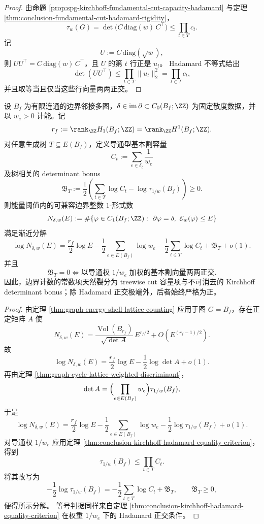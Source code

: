 \begin{proof}
由命题 \ref{prop:spg-kirchhoff-fundamental-cut-capacity-hadamard} 与定理 \ref{thm:conclusion-fundamental-cut-hadamard-rigidity}，
\[
\tau_w(G)=\det\!\bigl(C\,\mathrm{diag}(w)\,C^\top\bigr)\le \prod_{t\in T}c_t.
\]
记
\[
U:=C\,\mathrm{diag}(\sqrt{w}),
\]
则 \(UU^\top=C\,\mathrm{diag}(w)\,C^\top\)，且 \(U\) 的第 \(t\) 行正是 \(u_t\)。
Hadamard 不等式给出
\[
\det(UU^\top)\le \prod_{t\in T}\|u_t\|_2^2=\prod_{t\in T}c_t,
\]
并且取等当且仅当这些行向量两两正交。
\end{proof}

\begin{theorem}\label{thm:conclusion-boundary-1form-cut-determinant-splitting}
设 \(B_f\) 为有限连通的边界邻接多图，\(\delta\in\operatorname{im}\partial\subset C_0(B_f;\ZZ)\) 为固定散度数据，并以 \(w_e>0\) 计能。记
\[
r_f:=\rank_{\ZZ}H_1(B_f;\ZZ)=\rank_{\ZZ}H^1(B_f;\ZZ).
\]
对任意生成树 \(T\subseteq E(B_f)\)，定义导通型基本割容量
\[
C_t:=\sum_{e\in\delta_t}\frac1{w_e}
\]
及树相关的 determinant bonus
\[
\mathfrak B_T:=
\frac12\left(\sum_{t\in T}\log C_t-\log\tau_{1/w}(B_f)\right)\ge 0.
\]
则能量阈值内的可兼容边界整数 \(1\)-形式数
\[
N_{\delta,w}(E):=
\#\{\varphi\in C_1(B_f;\ZZ):\ \partial\varphi=\delta,\ \mathcal E_w(\varphi)\le E\}
\]
满足渐近分解
\[
\log N_{\delta,w}(E)
=
\frac{r_f}{2}\log E
-\frac12\sum_{e\in E(B_f)}\log w_e
-\frac12\sum_{t\in T}\log C_t
+\mathfrak B_T
+o(1).
\]
并且
\[
\mathfrak B_T=0
\iff
\text{以导通权 }1/w_e\text{ 加权的基本割向量两两正交}.
\]
因此，边界计数的常数项天然裂分为 treewise cut 容量项与不可消去的 Kirchhoff determinant bonus；除 Hadamard 正交极端外，后者始终严格为正。
\end{theorem}

\begin{proof}
由定理 \ref{thm:graph-energy-shell-lattice-counting} 应用于图 \(G=B_f\)，存在正定矩阵 \(A\) 使
\[
N_{\delta,w}(E)=\frac{\operatorname{Vol}(B_{r_f})}{\sqrt{\det A}}\,E^{r_f/2}+O(E^{(r_f-1)/2}).
\]
故
\[
\log N_{\delta,w}(E)
=
\frac{r_f}{2}\log E-\frac12\log\det A+o(1).
\]
再由定理 \ref{thm:graph-cycle-lattice-weighted-discriminant}，
\[
\det A=\Bigl(\prod_{e\in E(B_f)}w_e\Bigr)\tau_{1/w}(B_f),
\]
于是
\[
\log N_{\delta,w}(E)
=
\frac{r_f}{2}\log E
-\frac12\sum_{e\in E(B_f)}\log w_e
-\frac12\log\tau_{1/w}(B_f)
+o(1).
\]
对导通权 \(1/w_e\) 应用定理 \ref{thm:conclusion-kirchhoff-hadamard-equality-criterion}，得到
\[
\tau_{1/w}(B_f)\le \prod_{t\in T}C_t.
\]
将其改写为
\[
-\frac12\log\tau_{1/w}(B_f)
=
-\frac12\sum_{t\in T}\log C_t+\mathfrak B_T,
\qquad
\mathfrak B_T\ge 0,
\]
便得所示分解。
等号判据同样来自定理 \ref{thm:conclusion-kirchhoff-hadamard-equality-criterion} 在权重 \(1/w_e\) 下的 Hadamard 正交条件。
\end{proof}

